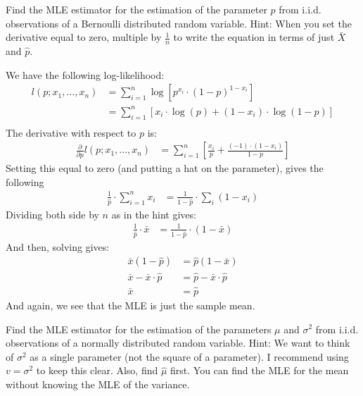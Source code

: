 
Find the MLE estimator for the estimation of the parameter $p$ from
i.i.d. observations of a Bernoulli distributed random variable. Hint:
When you set the derivative equal to zero, multiple by $\frac{1}{n}$ to
write the equation in terms of just $\bar{X}$ and $\hat{p}$. 


We have the following log-likelihood:
\begin{align*}
l(p; x_1, \ldots, x_n) &= \sum_{i=1}^n \log\left[ p^{x_i} \cdot (1 - p)^{1-x_i} \right]  \\
&= \sum_{i=1}^n \left[x_i \cdot \log(p) + (1-x_i) \cdot \log(1 - p) \right]  \\
\end{align*}
The derivative with respect to $p$ is:
\begin{align*}
\frac{\partial}{\partial p} l(p; x_1, \ldots, x_n)
&= \sum_{i=1}^n \left[ \frac{x_i}{p} + \frac{(-1) \cdot (1-x_i)}{1-p}  \right] 
\end{align*}
Setting this equal to zero (and putting a hat on the parameter), gives the following
\begin{align*}
\frac{1}{\hat{p}} \cdot \sum_{i=1}^n x_i &= \frac{1}{1-\hat{p}} \cdot \sum_i (1-x_i)
\end{align*}
Dividing both side by $n$ as in the hint gives:
\begin{align*}
\frac{1}{\hat{p}} \cdot \bar{x} &= \frac{1}{1-\hat{p}} \cdot (1-\bar{x})
\end{align*}
And then, solving gives:
\begin{align*}
\bar{x} (1 - \hat{p}) &= \hat{p} (1 - \bar{x}) \\
\bar{x} - \bar{x} \cdot \hat{p} &= \hat{p} - \bar{x} \cdot \hat{p} \\
\bar{x} &= \hat{p}
\end{align*}
And again, we see that the MLE is just the sample mean.


Find the MLE estimator for the estimation of the parameters $\mu$ and $\sigma^2$
from i.i.d. observations of a normally distributed random variable. Hint: We
want to think of $\sigma^2$ as a single parameter (not the square of a parameter).
I recommend using $v = \sigma^2$ to keep this clear. Also, find $\hat{\mu}$ first.
You can find the MLE for the mean without knowing the MLE of the variance.

